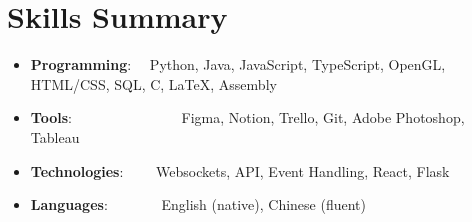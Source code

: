 \documentclass[letter,10pt]{extarticle}
\newcommand{\resumeSkillItem}[2]{
	\item\small{
		\textbf{#1}{: #2 \vspace{-2pt}}
	}
}
\newcommand{\resumeSubItem}[2]{\resumeSkillItem{#1}{#2}\vspace{-5pt}}
\newcommand{\resumeSubHeadingListStart}{\begin{itemize}[leftmargin=0.15in,label={}]}
\newcommand{\resumeSubHeadingListEnd}{\end{itemize}}
\begin{document}
\section{Skills Summary}
	\resumeSubHeadingListStart
		\resumeSubItem{Programming}
			{\hspace{0.6mm}~~Python, Java, JavaScript, TypeScript, OpenGL, HTML/CSS, SQL, C, \LaTeX, Assembly}
		\resumeSubItem{Tools}
            {\hspace{0.3mm}~~~~~~~~~~~~~~~Figma, Notion, Trello, Git, Adobe
                Photoshop, Tableau}
		\resumeSubItem{Technologies}
			{~~~~Websockets, API, Event Handling, React, Flask}
        \resumeSubItem{Languages}
			{\hspace{0.6mm}~~~~~~~English (native), Chinese (fluent)}
	\resumeSubHeadingListEnd
\end{document}
